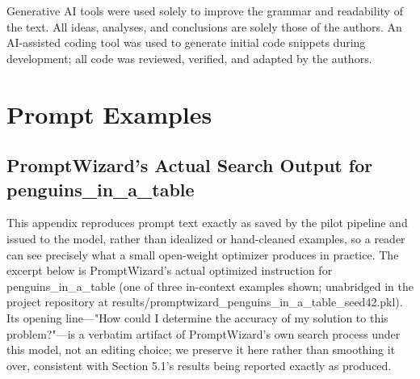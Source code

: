 \documentclass[a4paper,fleqn]{cas-sc}
\begin{document}
Generative AI tools were used solely to improve the grammar and readability of the text. All ideas, analyses, and conclusions are solely those of the authors. An AI-assisted coding tool was used to generate initial code snippets during development; all code was reviewed, verified, and adapted by the authors.

\appendix

\section{Prompt Examples}

\subsection{PromptWizard's Actual Search Output for penguins\_\allowbreak{}in\_\allowbreak{}a\_\allowbreak{}table}

This appendix reproduces prompt text exactly as saved by the pilot pipeline and issued to the model, rather than idealized or hand-cleaned examples, so a reader can see precisely what a small open-weight optimizer produces in practice. The excerpt below is PromptWizard's actual optimized instruction for penguins\_\allowbreak{}in\_\allowbreak{}a\_\allowbreak{}table (one of three in-context examples shown; unabridged in the project repository at results/promptwizard\_\allowbreak{}penguins\_\allowbreak{}in\_\allowbreak{}a\_\allowbreak{}table\_\allowbreak{}seed42.pkl). Its opening line---"How could I determine the accuracy of my solution to this problem?"---is a verbatim artifact of PromptWizard's own search process under this model, not an editing choice; we preserve it here rather than smoothing it over, consistent with Section 5.1's results being reported exactly as produced.
\end{document}
